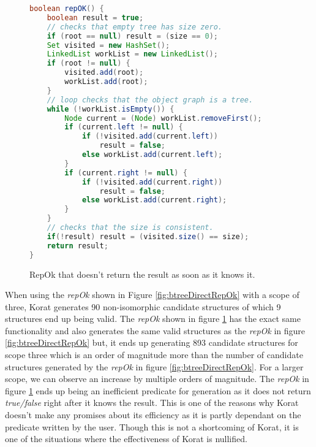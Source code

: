 \begin{figure}
\centering
\begin{lstlisting}[language=Java]
boolean repOK() {
    boolean result = true;
    // checks that empty tree has size zero.
    if (root == null) result = (size == 0);
    Set visited = new HashSet();
    LinkedList workList = new LinkedList();
    if (root != null) {
        visited.add(root);
        workList.add(root);
    }
    // loop checks that the object graph is a tree.
    while (!workList.isEmpty()) {
        Node current = (Node) workList.removeFirst();
        if (current.left != null) {
            if (!visited.add(current.left))
                result = false;
            else workList.add(current.left);
        }
        if (current.right != null) {
            if (!visited.add(current.right)) 
                result = false;
            else workList.add(current.right);
        }
    }
    // checks that the size is consistent.
    if(!result) result = (visited.size() == size);
    return result;
}
\end{lstlisting}
\caption{RepOk that doesn’t return the result as soon as it knows it.}
\label{fig:bTreeInefficient}
\end{figure}

\para
When using the \emph{repOk} shown in Figure \ref{fig:btreeDirectRepOk} with a scope of three, Korat generates 90 non-isomorphic candidate structures of which 9 structures end up being valid. The \emph{repOk} shown in figure \ref{fig:bTreeInefficient} has the exact same functionality and also generates the same valid structures as the \emph{repOk} in figure \ref{fig:btreeDirectRepOk} but, it ends up generating 893 candidate structures for scope three which is an order of magnitude more than the number of candidate structures generated by the \emph{repOk} in figure \ref{fig:btreeDirectRepOk}. For a larger scope, we can observe an increase by multiple orders of magnitude. The \emph{repOk} in figure \ref{fig:bTreeInefficient} ends up being an inefficient predicate for generation as it does not return \emph{true/false} right after it knows the result. This is one of the reasons why Korat doesn’t make any promises about its efficiency as it is partly dependant on the predicate written by the user. Though this is not a shortcoming of Korat, it is one of the situations where the effectiveness of Korat is nullified.
